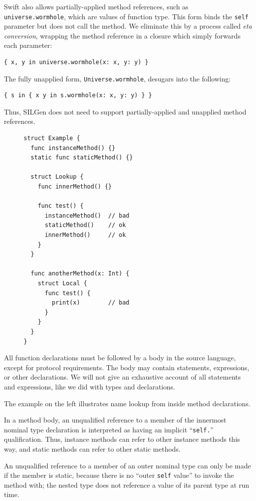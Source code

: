 \documentclass[../generics]{subfiles}
\begin{document}
Swift also allows partially-applied method references, such as \texttt{universe.wormhole}, which are values of function type. This form binds the \texttt{self} parameter but does not call the method. We eliminate this by a process called \emph{eta conversion}, wrapping the method reference in a closure which simply forwards each parameter:
\begin{Verbatim}
{ x, y in universe.wormhole(x: x, y: y) }
\end{Verbatim}
The fully unapplied form, \texttt{Universe.wormhole}, desugars into the following:
\begin{Verbatim}
{ s in { x y in s.wormhole(x: x, y: y) } }
\end{Verbatim}
Thus, SILGen does not need to support partially-applied and unapplied method references.

\begin{figure}
\begin{minipage}{17em}
\begin{Verbatim}
struct Example {
  func instanceMethod() {}
  static func staticMethod() {}

  struct Lookup {
    func innerMethod() {}

    func test() {
      instanceMethod()  // bad
      staticMethod()    // ok
      innerMethod()     // ok
    }
  }

  func anotherMethod(x: Int) {
    struct Local {
      func test() {
        print(x)        // bad
      }
    }
  }
}
\end{Verbatim}
\end{minipage}
\end{figure}

All function declarations must be followed by a body in the source language, except for protocol requirements. The body may contain statements, expressions, or other declarations. We will not give an exhaustive account of all statements and expressions, like we did with types and declarations.

The example on the left illustrates name lookup from inside method declarations.

In a method body, an unqualified reference to a member of the innermost nominal type declaration is interpreted as having an implicit ``\texttt{self.}'' qualification. Thus, instance methods can refer to other instance methods this way, and static methods can refer to other static methods.

An unqualified reference to a member of an outer nominal type can only be made if the member is static, because there is no ``outer \texttt{self} value'' to invoke the method with; the nested type does not reference a value of its parent type at run time.
\end{document}

